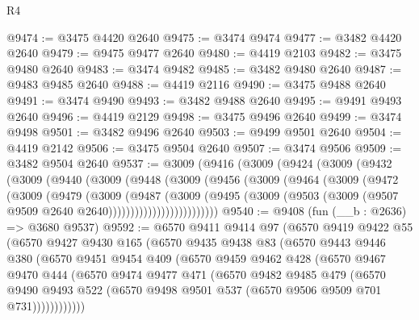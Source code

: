 \begin{lexlean}{R4}
\begin{coremodule}
@9474 := @3475 @4420 @2640
@9475 := @3474 @9474
@9477 := @3482 @4420 @2640
@9479 := @9475 @9477 @2640
@9480 := @4419 @2103
@9482 := @3475 @9480 @2640
@9483 := @3474 @9482
@9485 := @3482 @9480 @2640
@9487 := @9483 @9485 @2640
@9488 := @4419 @2116
@9490 := @3475 @9488 @2640
@9491 := @3474 @9490
@9493 := @3482 @9488 @2640
@9495 := @9491 @9493 @2640
@9496 := @4419 @2129
@9498 := @3475 @9496 @2640
@9499 := @3474 @9498
@9501 := @3482 @9496 @2640
@9503 := @9499 @9501 @2640
@9504 := @4419 @2142
@9506 := @3475 @9504 @2640
@9507 := @3474 @9506
@9509 := @3482 @9504 @2640
@9537 := @3009
    (@9416
      (@3009
        (@9424
          (@3009
            (@9432
              (@3009
                (@9440
                  (@3009
                    (@9448
                      (@3009
                        (@9456
                          (@3009
                            (@9464
                              (@3009
                                (@9472
                                  (@3009
                                    (@9479
                                      (@3009
                                        (@9487
                                          (@3009
                                            (@9495
                                              (@3009
                                                (@9503
                                                  (@3009
                                                    (@9507
                                                      @9509
                                                      @2640
                                                      @2640)))))))))))))))))))))))))
@9540 := @9408 (fun (__b : @2636) => @3680 @9537)
@9592 := @6570
    @9411
    @9414
    @97
    (@6570
      @9419
      @9422
      @55
      (@6570
        @9427
        @9430
        @165
        (@6570
          @9435
          @9438
          @83
          (@6570
            @9443
            @9446
            @380
            (@6570
              @9451
              @9454
              @409
              (@6570
                @9459
                @9462
                @428
                (@6570
                  @9467
                  @9470
                  @444
                  (@6570
                    @9474
                    @9477
                    @471
                    (@6570
                      @9482
                      @9485
                      @479
                      (@6570
                        @9490
                        @9493
                        @522
                        (@6570 @9498 @9501 @537 (@6570 @9506 @9509 @701 @731))))))))))))

\end{coremodule}
\end{lexlean}

